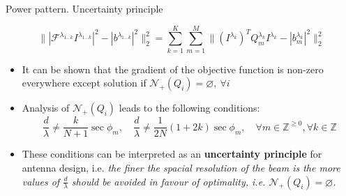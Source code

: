 \documentclass[../main.tex]{subfiles}
\begin{document}
\begin{frame}[t]{Power pattern. Uncertainty principle}

\begin{equation*}
\Big\| |\mathcal{F}^{\lambda_{1 \ldots k}} I^{\lambda_{1\ldots k}}|^2 - |b^{\lambda_{1 \ldots k}}|^2 \Big\|_2^2 = \sum_{k=1}^K \sum_{m=1}^M \Big\| (I^{\lambda_{k}})^T Q^{\lambda_{k}}_m  I^{\lambda_{k}} - |b^{\lambda_{k}}_m|^2 \Big\|_2^2
\end{equation*}


 
\begin{itemize}
	\item It can be shown that the gradient of the objective function is non-zero everywhere except solution if $\mathcal{N}_{+}(Q_i) = \varnothing, ~\forall i$
	\item Analysis of $\mathcal{N}_{+}(Q_i)$ leads to the following conditions:
	\begin{equation*}
  \frac{d}{\lambda} \neq \frac{k}{N+1} \sec \phi_m , \quad \frac{d}{\lambda} \neq \frac{1}{2N} (1 + 2k) \sec \phi_m, \quad \forall m \in \mathbb{Z}^{\ge 0}, \forall k \in \mathbb{Z}
  \label{antenna_design_condition}
	\end{equation*}
	\item These conditions can be interpreted as an \textbf{uncertainty principle} for antenna design, i.e. \textit{the finer the spacial resolution of the beam is the more values of $\frac{d}{\lambda}$ should be avoided in favour of optimality, i.e. $\mathcal{N}_{+}(Q_i) = \varnothing$.}
\end{itemize}

\end{frame}
\end{document}
